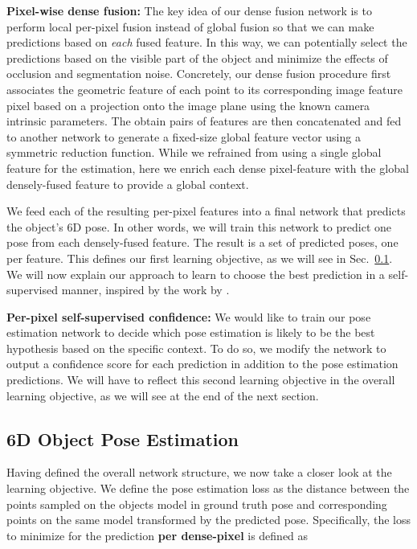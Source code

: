 \documentclass[10pt,twocolumn,letterpaper]{article}
\begin{document}
\noindent\textbf{Pixel-wise dense fusion:}
The key idea of our dense fusion network is to perform local per-pixel fusion instead of global fusion so that we can make predictions based on \emph{each} fused feature. In this way, we can potentially select the predictions based on the visible part of the object and minimize the effects of occlusion and segmentation noise. Concretely, our dense fusion procedure first associates the geometric feature of each point to its corresponding image feature pixel based on a projection onto the image plane using the known camera intrinsic parameters. The obtain pairs of features are then concatenated and fed to another network to generate a fixed-size global feature vector using a symmetric reduction function. While we refrained from using a single global feature for the estimation, here we enrich each dense pixel-feature with the global densely-fused feature to provide a global context.

We feed each of the resulting per-pixel features into a final network that predicts the object's 6D pose. In other words, we will train this network to predict one pose from each densely-fused feature. The result is a set of  predicted poses, one per feature. This defines our first learning objective, as we will see in Sec.~\ref{ssec::loss}. We will now explain our approach to learn to choose the best prediction in a self-supervised manner, inspired by the work by \citet{xu2017pointfusion}.

\noindent\textbf{Per-pixel self-supervised confidence:}
We would like to train our pose estimation network to decide which pose estimation is likely to be the best hypothesis based on the specific context. To do so, we modify the network to output a confidence score  for each prediction in addition to the pose estimation predictions. We will have to reflect this second learning objective in the overall learning objective, as we will see at the end of the next section.

\subsection{6D Object Pose Estimation}
\label{ssec::loss}
Having defined the overall network structure, we now take a closer look at the learning objective. We define the pose estimation loss as the distance between the points sampled on the objects model in ground truth pose and corresponding points on the same model transformed by the predicted pose.  Specifically, the loss to minimize for the prediction \textbf{per dense-pixel} is defined as
\end{document}
